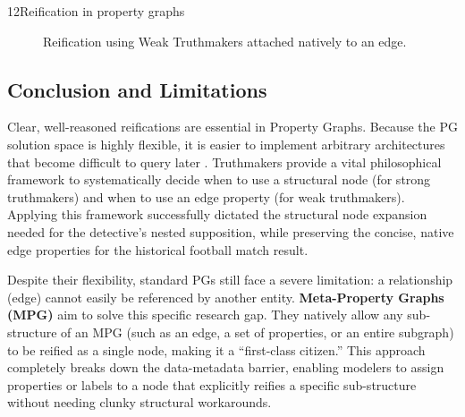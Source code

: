 \begin{question}{1}{2}{Reification in property graphs}
\begin{figure}[htbp]
\caption{Reification using Weak Truthmakers attached natively to an edge.}
\label{fig:reification_football}
\end{figure}

\subsection{Conclusion and Limitations}

Clear, well-reasoned reifications are essential in Property Graphs. Because the PG solution space is highly flexible, it is easier to implement arbitrary architectures that become difficult to query later \cite{angles_foundations_2017}. Truthmakers provide a vital philosophical framework to systematically decide when to use a structural node (for strong truthmakers) and when to use an edge property (for weak truthmakers). Applying this framework successfully dictated the structural node expansion needed for the detective's nested supposition, while preserving the concise, native edge properties for the historical football match result.

Despite their flexibility, standard PGs still face a severe limitation: a relationship (edge) cannot easily be referenced by another entity. \textbf{Meta-Property Graphs (MPG)}\cite{sadoughi_meta-property_2025} aim to solve this specific research gap. They natively allow any sub-structure of an MPG (such as an edge, a set of properties, or an entire subgraph) to be reified as a single node, making it a ``first-class citizen.'' This approach completely breaks down the data-metadata barrier, enabling modelers to assign properties or labels to a node that explicitly reifies a specific sub-structure without needing clunky structural workarounds.

\end{question}